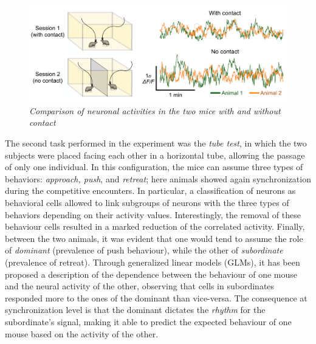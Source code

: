 \documentclass[12pt, a4paper]{article}
\begin{document}
\begin{figure}[H]
	\begin{center}
		\includegraphics[scale=.70]{kingsbury.png} 
	\end{center} 
	\caption{\textit{Comparison of neuronal activities in the two mice with and without contact}} \label{kingsbury}
	
\end{figure}


The second task performed in the experiment was the \textit{tube test}, in which the two subjects were placed facing each other in a horizontal tube, allowing the passage of only one individual. In this configuration, the mice can assume three types of behaviors: \textit{approach, push}, and \textit{retreat}; here animals showed again synchronization during the competitive encounters. In particular, a classification of neurons as behavioral cells allowed to link subgroups of neurons with the three types of behaviors depending on their activity values. Interestingly, the removal of these behaviour cells resulted in a marked reduction of the correlated activity. Finally, between the two animals, it was evident that one would tend to assume the role of \textit{dominant} (prevalence of push behaviour), while the other of \textit{subordinate} (prevalence of retreat). Through generalized linear models (GLMs), it has been proposed a description of the dependence between the behaviour of one mouse and the neural activity of the other, observing that cells in subordinates responded more to the ones of the dominant than vice-versa. The consequence at synchronization level is that the dominant dictates the \textit{rhythm} for the subordinate's signal, making it able to predict the expected behaviour of one mouse based on the activity of the other.
\end{document}
